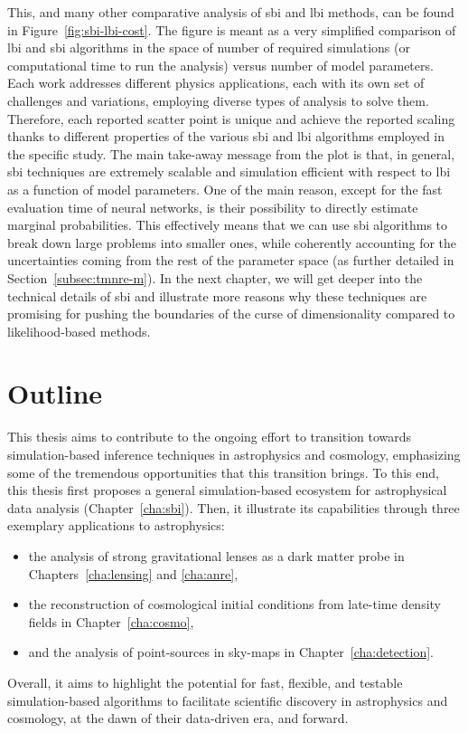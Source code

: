 This, and many other comparative analysis of \gls*{sbi} and \gls*{lbi} methods, can be found in Figure~\ref{fig:sbi-lbi-cost}. The figure is meant as a very simplified comparison of \gls*{lbi} and \gls*{sbi} algorithms in the space of number of required simulations (or computational time to run the analysis) versus number of model parameters. Each work addresses different physics applications, each with its own set of challenges and variations, employing diverse types of analysis to solve them. Therefore, each reported scatter point is unique and achieve the reported scaling thanks to different properties of the various \gls*{sbi} and \gls*{lbi} algorithms employed in the specific study. The main take-away message from the plot is that, in general, \gls*{sbi} techniques are extremely scalable and simulation efficient with respect to \gls*{lbi} as a function of model parameters. One of the main reason, except for the fast evaluation time of neural networks, is their possibility to directly estimate marginal probabilities. This effectively means that we can use \gls*{sbi} algorithms to break down large problems into smaller ones, while coherently accounting for the uncertainties coming from the rest of the parameter space (as further detailed in Section~\ref{subsec:tmnre-m}). In the next chapter, we will get deeper into the technical details of \gls*{sbi} and illustrate more reasons why these techniques are promising for pushing the boundaries of the curse of dimensionality compared to likelihood-based methods.


\section{Outline}
This thesis aims to contribute to the ongoing effort to transition towards simulation-based inference techniques in astrophysics and cosmology, emphasizing some of the tremendous opportunities that this transition brings. To this end, this thesis first proposes a general simulation-based ecosystem for astrophysical data analysis (Chapter~\ref{cha:sbi}). Then, it illustrate its capabilities through three exemplary applications to astrophysics: 
\begin{itemize}[leftmargin=1cm]
	\item the analysis of strong gravitational lenses as a dark matter probe in Chapters~\ref{cha:lensing} and \ref{cha:anre}, 
	\item the reconstruction of cosmological initial conditions from late-time density fields in Chapter~\ref{cha:cosmo}, 
	\item and the analysis of point-sources in sky-maps in Chapter~\ref{cha:detection}. 
\end{itemize}
Overall, it aims to highlight the potential for fast, flexible, and testable simulation-based algorithms to facilitate scientific discovery in astrophysics and cosmology, at the dawn of their data-driven era, and forward.




